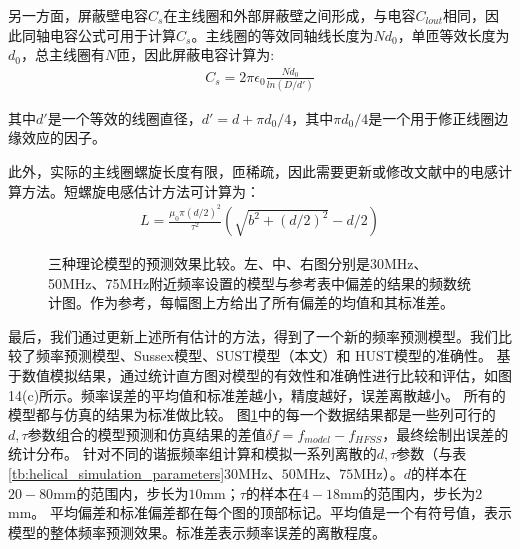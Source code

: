 另一方面，屏蔽壁电容$C_s$在主线圈和外部屏蔽壁之间形成，与电容$C_{lout}$相同，因此同轴电容公式可用于计算$C_s$。主线圈的等效同轴线长度为$Nd_0$，单匝等效长度为$d_0$，总主线圈有$N$匝，因此屏蔽电容计算为:
\begin{align}
    C_s=2\pi\epsilon_0 \frac{Nd_0}{ln(D/d')} \label{eq:helical_C_s_new}
\end{align}

其中$d'$是一个等效的线圈直径，$d'=d+\pi d_0/4$，其中$\pi d_0/4$是一个用于修正线圈边缘效应的因子。

此外，实际的主线圈螺旋长度有限，匝稀疏，因此需要更新或修改文献\cite[]{Siverns_Simkins_Weidt_Hensinger_2012}中的电感计算方法。短螺旋电感估计方法可计算为：
\begin{align}
    L=\frac{\mu_0 \pi (d/2)^2 }{\tau^2} (\sqrt{b^2+(d/2)^2}-d/2) \label{eq:helical_L_new}
\end{align}

\begin{figure}
    \centering
    \caption[三种理论模型的预测效果比较]{三种理论模型的预测效果比较。左、中、右图分别是30MHz、50MHz、75MHz附近频率设置的模型与参考表中偏差的结果的频数统计图。作为参考，每幅图上方给出了所有偏差的均值和其标准差。\label{fig:helical_freqmodelcompare}}

\end{figure}

最后，我们通过更新上述所有估计的方法，得到了一个新的频率预测模型。我们比较了频率预测模型、Sussex模型\cite[]{Siverns_Simkins_Weidt_Hensinger_2012}、SUST模型（本文）和 HUST模型\cite[]{Deng_Sun_Yuan_Xu_Zhang_Lu_Luo_2014}的准确性。
基于数值模拟结果，通过统计直方图对模型的有效性和准确性进行比较和评估，如图14(c)所示。频率误差的平均值和标准差越小，精度越好，误差离散越小。
所有的模型都与仿真的结果为标准做比较。
图\ref{fig:helical_freqmodelcompare}中的每一个数据结果都是一些列可行的$d,\tau$参数组合的模型预测和仿真结果的差值$\delta f=f_{model}-f_{HFSS}$，最终绘制出误差的统计分布。
针对不同的谐振频率组计算和模拟一系列离散的$d,\tau$参数（与表\ref{tb:helical_simulation_parameters}$30$MHz、$50$MHz、$75$MHz）。$d$的样本在$20-80$mm的范围内，步长为$10$mm；$\tau$的样本在$4-18$mm的范围内，步长为$2$mm。
平均偏差和标准偏差都在每个图的顶部标记。平均值是一个有符号值，表示模型的整体频率预测效果。标准差表示频率误差的离散程度。


